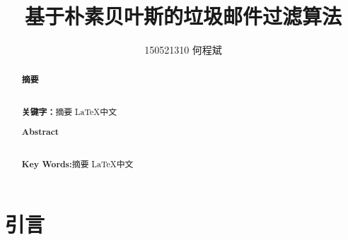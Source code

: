 \documentclass[UTF8,zihao=-4]{ctexart}
\title{基于朴素贝叶斯的垃圾邮件过滤算法}
\author{150521310 何程斌}
\date{}
\begin{document}


\begin{abstract}
  \begin{center}
    {\noindent{} \linespread{1.25}\songti{}\textbf{摘要}}
  \end{center}

  \linespread{1.25}\songti{}\zhlipsum*[1]\\

  \noindent\heiti{}\textbf{关键字：}摘要  \LaTeX  中文
\end{abstract}
\newpage

\begin{abstract}
  \begin{center}
    {\noindent{} \linespread{1.25}\textbf{Abstract}}
  \end{center}

  \linespread{1.25} \lipsum*[1]\\

  \noindent{}\textbf{Key Words:}摘要  \LaTeX  中文
\end{abstract}
\newpage

\linespread{1.25}
\tableofcontents
\newpage

\section{引言}
\zhlipsum*[2]
\end{document}
